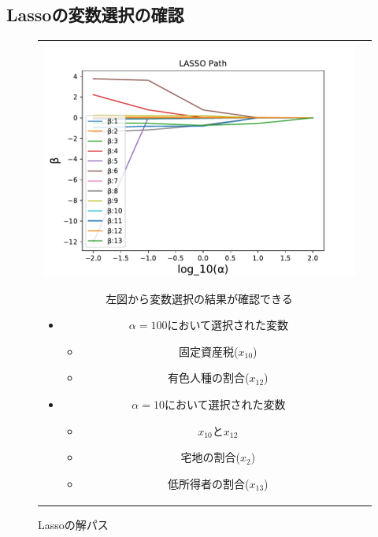 \documentclass[dvipdfmx, 10pt]{beamer}
\begin{document}
\subsection{Lassoの変数選択の確認}
\begin{frame}{\insertsubsection}
    \begin{figure}[H]
            \begin{tabular}{cc}
            	 \begin{minipage}{0.5\hsize}
                   	 \includegraphics[width=1.0\linewidth]{../img/lassoPath.pdf}
            		 \caption{Lassoの解パス}
            		 \label{fig:lasso}
            	\end{minipage}
	 	\begin{minipage}{0.5\hsize}
                           左図から変数選択の結果が確認できる
                               \begin{itemize}
                                   \item $\alpha=100$において選択された変数
                                    \begin{itemize}
                                        \item 固定資産税($x_{10}$)
                                        \item 有色人種の割合($x_{12}$)
                                   \end{itemize}
                                  \item $\alpha=10$において選択された変数
                                  \begin{itemize}
                                        \item $x_{10}$と$x_{12}$
                                        \item 宅地の割合($x_2$)
                                        \item 低所得者の割合($x_{13}$)
                                   \end{itemize}
                               \end{itemize}
            	\end{minipage}
    	     \end{tabular}
    \end{figure}
\end{frame}
\end{document}
